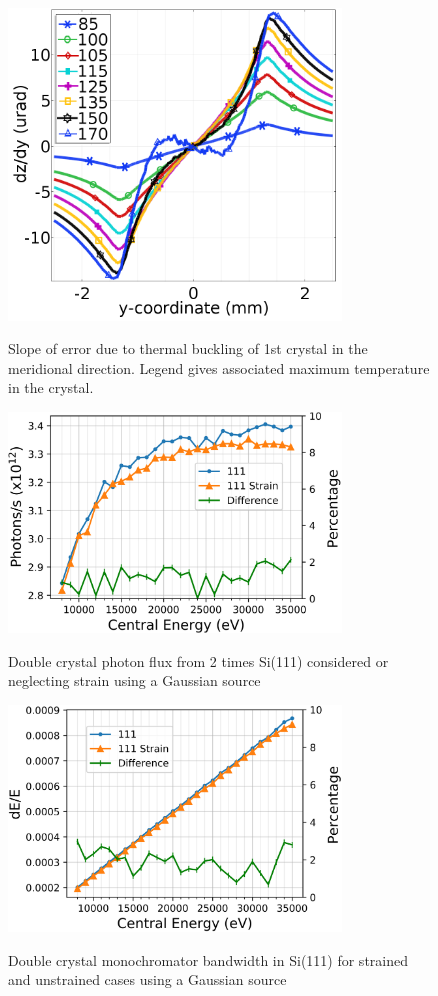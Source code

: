 \documentclass{iucr}
\begin{document}
\begin{figure}
\caption{Slope of error due to thermal buckling of 1st crystal in the meridional direction. Legend gives associated maximum temperature in the crystal.}
\includegraphics[width = 8.85cm]{images/slope.png}
\label{fig:yslope}
\end{figure}

\begin{figure}
\caption{Double crystal photon flux from 2 times Si(111) considered or neglecting strain using a Gaussian source}
\includegraphics[width = 8.85cm]{images/111flux.png}
\label{fig:111flux}
\end{figure}

\begin{figure}
\caption{Double crystal monochromator bandwidth in Si(111) for strained and unstrained cases using a Gaussian source}
\includegraphics[width = 8.85cm]{images/111monobw.png}
\label{fig:111monobw}
\end{figure}
\end{document}
